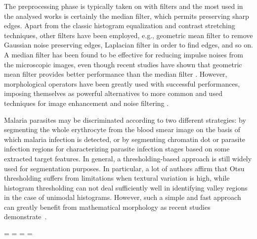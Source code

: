 \documentclass[sensors,review,accept,moreauthors,pdftex,10pt,a4paper]{mdpi}
\begin{document}
The preprocessing phase is typically taken on with filters and the most used in the analysed works is certainly the median filter, which permits preserving sharp edges. Apart from the classic histogram equalization and contrast stretching techniques, other filters have been employed, e.g., geometric mean filter to remove Gaussian noise preserving edges, Laplacian filter in order to find edges, and so on.
A median filter has been found to be effective for reducing impulse noises from the microscopic images, even though recent studies have shown that geometric mean filter provides better performance than the median filter \cite{Das2013,Das2015}. However, morphological operators have been greatly used with successful performances, imposing themselves as powerful alternatives to more common and used techniques for image enhancement and noise filtering \cite{DiRuberto2002,Gonzalez2016,Kareem2011,Kareem2012,Malihi2013,Mushabe2013,Oliveira2017,Reni2015,Romero2016,Ross2006,Sheik2013,Somasekar2015,Springl2009,Tek2010}.

Malaria parasites may be discriminated according to two different strategies: by segmenting the whole erythrocyte from the blood smear image on the basis of which malaria infection is detected, or by segmenting chromatin dot or parasite infection regions for characterizing parasite infection stages based on some extracted target features.
In general, a thresholding-based approach is still widely used for segmentation purposes. In particular, a lot of authors affirm that Otsu thresholding suffers from limitations when textural variation is high, while histogram thresholding can not deal sufficiently well in identifying valley regions in the case of unimodal histograms. However, such a simple and fast approach can greatly benefit from mathematical morphology as recent studies demonstrate~\cite{Anggraini2011,Arco2014,DiRuberto2002,Elter2011,Kareem2011,Mushabe2013,Rosado2017,Ross2006,Savkare2011b,Savkare2015,Somasekar2017,Tek2010}.


\newpage
\paperwidth=\pdfpageheight
\paperheight=\pdfpagewidth
\pdfpageheight=\paperheight
\pdfpagewidth=\paperwidth
{}
\fancyheadoffset[LO,RE]{0cm}
\fancyheadoffset[RO,LE]{0cm}
\end{document}
